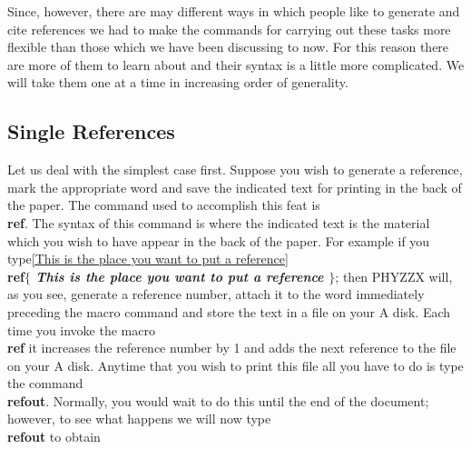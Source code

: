 Since, however,
there are may different ways in which people like to
generate and cite references we had to make the commands for
carrying out these tasks more flexible than those which we
have been discussing to now.
For this reason there are more of them to learn about
and their syntax is a little more complicated.
We will take them one at a time in increasing order of
generality.
 
\subsection{Single References}
 
Let us deal with the simplest case first.
Suppose you wish to generate a reference, mark the appropriate word
and save the indicated text for printing in the back of the paper.
The command used to accomplish this feat is
{\bf \\ref}.
The syntax of this command is
where the indicated text is the material which you wish to have
appear in the back of the paper.
For example if you type\ref{This is the place you want to put a
reference}{\bf \\ref$\{$ \it This is the place you want to put a
reference \bf $\}$}; then PHYZZX will, as you see, generate a
reference number, attach it to the word immediately preceding
the macro command and store the text in a file on your A disk.
Each time you invoke the macro {\bf \\ref} it increases the
reference number by 1 and adds the next reference to the file on
your A disk.
Anytime that you wish to print this file all you have to do is
type the command {\bf \\refout}.
Normally, you would wait to do this until the end of the document;
however, to see what happens we will now type {\bf \\refout} to
obtain
\nobreak
{}
 
